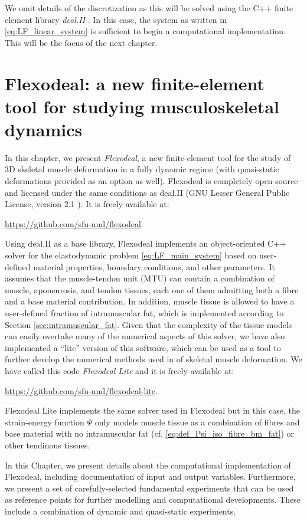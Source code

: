 \documentclass{sfuthesis}
\numberwithin{equation}{section}
\numberwithin{figure}{chapter}
\numberwithin{table}{chapter}
\theoremstyle{definition}
\begin{document}
We omit details of the discretization as this will be solved using the C++ finite element library \textit{deal.II} \cite{dealii}. In this case, the system as written in \eqref{eq:LF_linear_system} is sufficient to begin a computational implementation. This will be the focus of the next chapter.


\chapter{Flexodeal: a new finite-element tool for studying musculoskeletal dynamics}

In this chapter, we present \textit{Flexodeal}, a new finite-element tool for the study of 3D skeletal muscle deformation in a fully dynamic regime (with quasi-static deformations provided as an option as well). Flexodeal is completely open-source and licensed under the same conditions as deal.II (GNU Lesser General Public License, version 2.1 \cite{dealii}). It is freely available at:
\begin{center}
    \url{https://github.com/sfu-nml/flexodeal}.
\end{center}
Using deal.II as a base library, Flexodeal implements an object-oriented C++ solver for the elastodynamic problem \eqref{eq:LF_main_system} based on user-defined material properties, boundary conditions, and other parameters. 
It assumes that the muscle-tendon unit (MTU) can contain a combination of muscle, aponeurosis, and tendon tissues, each one of them admitting both a fibre and a base material contribution. In addition, muscle tissue is allowed to have a user-defined fraction of intramuscular fat, which is implemented according to Section \ref{sec:intramuscular_fat}. Given that the complexity of the tissue models can easily overtake many of the numerical aspects of this solver, we have also implemented a ``lite'' version of this software, which can be used as a tool to further develop the numerical methods used in of skeletal muscle deformation. We have called this code \textit{Flexodeal Lite} and it is freely available at:
\begin{center}
    \url{https://github.com/sfu-nml/flexodeal-lite}.
\end{center}
Flexodeal Lite implements the same solver used in Flexodeal but in this case, the strain-energy function $\Psi$ only models muscle tissue as a combination of fibres and base material with no intramuscular fat (cf. \eqref{eq:def_Psi_iso_fibre_bm_fat}) or other tendinous tissues.

In this Chapter, we present details about the computational implementation of Flexodeal, including documentation of input and output variables. Furthermore, we present a set of carefully-selected fundamental experiments that can be used as reference points for further modelling and computatiional developments. These include a combination of dynamic and quasi-static experiments.
\end{document}
